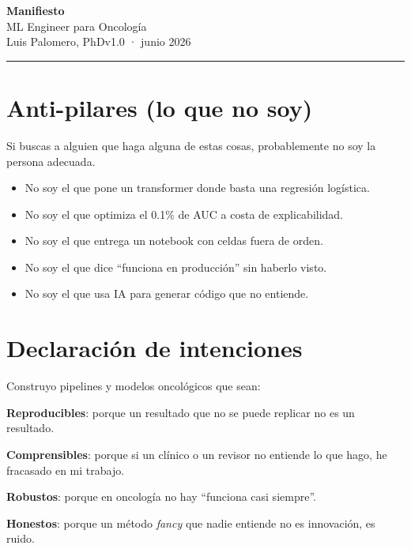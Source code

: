 \documentclass[11pt]{article}
\begin{document}
\begin{center}
  {\LARGE\bfseries Manifiesto}\\[4pt]
  {\large ML Engineer para Oncología}\\[12pt]
  {\normalsize Luis Palomero, PhD\hfill v1.0 · junio 2026}
\end{center}

\hrule
\vspace{1em}

\section*{Anti-pilares (lo que no soy)}

Si buscas a alguien que haga alguna de estas cosas, probablemente no soy la persona adecuada.

\begin{itemize}[label=\textendash]
  \item No soy el que pone un transformer donde basta una regresión logística.
  \item No soy el que optimiza el 0.1\% de AUC a costa de explicabilidad.
  \item No soy el que entrega un notebook con celdas fuera de orden.
  \item No soy el que dice \enquote{funciona en producción} sin haberlo visto.
  \item No soy el que usa IA para generar código que no entiende.
\end{itemize}

\section*{Declaración de intenciones}

Construyo pipelines y modelos oncológicos que sean:

\vspace{0.5em}

\begin{mdframed}[leftline=true, topline=false, bottomline=false, rightline=false, innerleftmargin=1em, innerrightmargin=1em, skipabove=0.5em, skipbelow=0.5em]
  \textbf{Reproducibles}: porque un resultado que no se puede replicar no es un resultado.

  \textbf{Comprensibles}: porque si un clínico o un revisor no entiende lo que hago, he fracasado en mi trabajo.

  \textbf{Robustos}: porque en oncología no hay \enquote{funciona casi siempre}.

  \textbf{Honestos}: porque un método \emph{fancy} que nadie entiende no es innovación, es ruido.
\end{mdframed}
\end{document}
